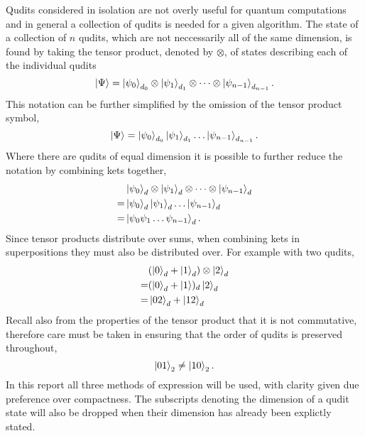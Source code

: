 Qudits considered in isolation are not overly useful for quantum computations and in general a collection of qudits is needed for a given algorithm.
The state of a collection of $n$ qudits, which are not neccessarily all of the same dimension, is found by taking the tensor product, denoted by $\otimes$, of states describing each of the individual qudits
\begin{equation}
    \ket{\Psi} = \ket{\psi_0}_{d_0} \otimes \ket{\psi_1}_{d_1} \otimes \dots \otimes \ket{\psi_{n-1}}_{d_{n-1}}.
\end{equation}
This notation can be further simplified by the omission of the tensor product symbol,
\begin{equation}
    \ket{\Psi} = \ket{\psi_0}_{d_0}\ket{\psi_1}_{d_1}\dots\ket{\psi_{n-1}}_{d_{n-1}}.
\end{equation}
Where there are qudits of equal dimension it is possible to further reduce the notation by combining kets together,
\begin{align}
    &\ket{\psi_0}_d \otimes \ket{\psi_1}_d \otimes \dots \otimes \ket{\psi_{n-1}}_d\\
    = &\ket{\psi_0}_d\ket{\psi_1}_d\dots\ket{\psi_{n-1}}_d\\
    = &\ket{\psi_0\psi_1\dots\psi_{n-1}}_d.
\end{align}
Since tensor products distribute over sums, when combining kets in superpositions they must also be distributed over.
For example with two qudits,
\begin{align}
    &(\ket{0}_d + \ket{1}_d)\otimes\ket{2}_d\\
    = &(\ket{0}_d + \ket{1})_d\ket{2}_d\\
    = &\ket{02}_d + \ket{12}_d
\end{align}
Recall also from the properties of the tensor product that it is not commutative, therefore care must be taken in ensuring that the order of qudits is preserved throughout,
\begin{equation}
    \ket{01}_2 \neq \ket{10}_2.
\end{equation}
In this report all three methods of expression will be used, with clarity given due preference over compactness.
The subscripts denoting the dimension of a qudit state will also be dropped when their dimension has already been explictly stated.

